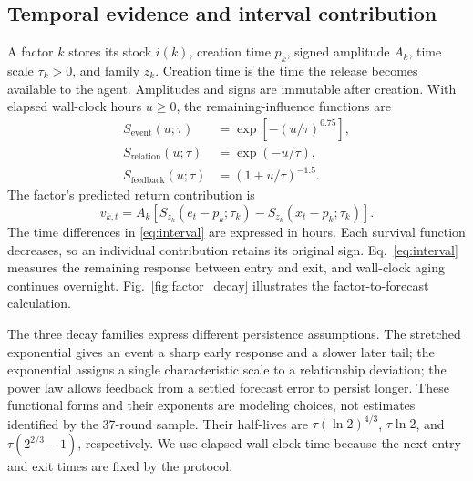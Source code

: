 \documentclass[conference]{IEEEtran}
\begin{document}
\subsection{Temporal evidence and interval contribution}
A factor $k$ stores its stock $i(k)$, creation time $p_k$, signed amplitude $A_k$, time scale $\tau_k>0$, and family $z_k$. Creation time is the time the release becomes available to the agent. Amplitudes and signs are immutable after creation. With elapsed wall-clock hours $u\geq0$, the remaining-influence functions are
\begin{align}
 S_{\mathrm{event}}(u;\tau)&=\exp[-(u/\tau)^{0.75}],\\
 S_{\mathrm{relation}}(u;\tau)&=\exp(-u/\tau),\\
 S_{\mathrm{feedback}}(u;\tau)&=(1+u/\tau)^{-1.5}.
\end{align}
The factor's predicted return contribution is
\begin{equation}
 v_{k,t}=A_k\left[S_{z_k}(e_t-p_k;\tau_k)
                    -S_{z_k}(x_t-p_k;\tau_k)\right].
 \label{eq:interval}
\end{equation}
The time differences in \eqref{eq:interval} are expressed in hours. Each survival function decreases, so an individual contribution retains its original sign. Eq.~\eqref{eq:interval} measures the remaining response between entry and exit, and wall-clock aging continues overnight. Fig.~\ref{fig:factor_decay} illustrates the factor-to-forecast calculation.

The three decay families express different persistence assumptions. The stretched exponential gives an event a sharp early response and a slower later tail; the exponential assigns a single characteristic scale to a relationship deviation; the power law allows feedback from a settled forecast error to persist longer. These functional forms and their exponents are modeling choices, not estimates identified by the 37-round sample. Their half-lives are $\tau(\ln 2)^{4/3}$, $\tau\ln 2$, and $\tau(2^{2/3}-1)$, respectively. We use elapsed wall-clock time because the next entry and exit times are fixed by the protocol.
\end{document}

